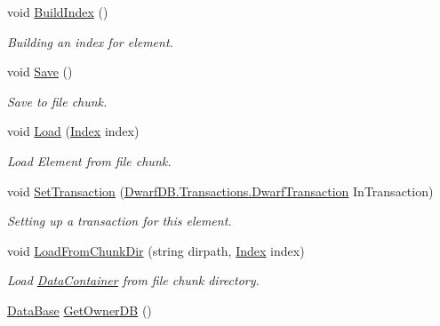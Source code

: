 \begin{DoxyCompactItemize}
\item 
void \hyperlink{class_dwarf_d_b_1_1_data_structures_1_1_data_container_a8f32eb712d14d6dbf42a95098673dd19}{BuildIndex} ()
\begin{DoxyCompactList}\small\item\em Building an index for element. \item\end{DoxyCompactList}\item 
void \hyperlink{class_dwarf_d_b_1_1_data_structures_1_1_data_container_a3ca82caee7d6f38c74dbb4e2a637aecb}{Save} ()
\begin{DoxyCompactList}\small\item\em Save to file chunk. \item\end{DoxyCompactList}\item 
void \hyperlink{class_dwarf_d_b_1_1_data_structures_1_1_data_container_ab045853ddb62b681d2474d7e547186de}{Load} (\hyperlink{class_dwarf_d_b_1_1_data_structures_1_1_index}{Index} index)
\begin{DoxyCompactList}\small\item\em Load Element from file chunk. \item\end{DoxyCompactList}\item 
void \hyperlink{class_dwarf_d_b_1_1_data_structures_1_1_data_container_a40b2dc31b54b0d41b29e58ea5ea4a3fb}{SetTransaction} (\hyperlink{class_dwarf_d_b_1_1_transactions_1_1_dwarf_transaction}{DwarfDB.Transactions.DwarfTransaction} InTransaction)
\begin{DoxyCompactList}\small\item\em Setting up a transaction for this element. \item\end{DoxyCompactList}\item 
void \hyperlink{class_dwarf_d_b_1_1_data_structures_1_1_data_container_a0a82f79c53628134d16f2fa21db221bf}{LoadFromChunkDir} (string dirpath, \hyperlink{class_dwarf_d_b_1_1_data_structures_1_1_index}{Index} index)
\begin{DoxyCompactList}\small\item\em Load \hyperlink{class_dwarf_d_b_1_1_data_structures_1_1_data_container}{DataContainer} from file chunk directory. \item\end{DoxyCompactList}\item 
\hyperlink{class_dwarf_d_b_1_1_data_structures_1_1_data_base}{DataBase} \hyperlink{class_dwarf_d_b_1_1_data_structures_1_1_data_container_a30765f0c417065245bb4c065c7eb29e0}{GetOwnerDB} ()

\end{DoxyCompactItemize}
